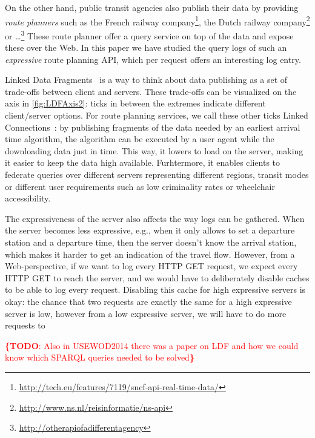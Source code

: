\documentclass{sig-alternate}
\newcommand{\todo}[1]{\noindent\textcolor{red}{{\bf \{TODO}: #1{\bf \}}}}
\begin{document}
On the other hand, public transit agencies also publish their data by providing \emph{route planners} such as the French railway company\footnote{\url{http://tech.eu/features/7119/sncf-api-real-time-data/}}, the Dutch railway company\footnote{\url{http://www.ns.nl/reisinformatie/ns-api}} or \ldots\footnote{\url{http://otherapiofadifferentagency}}
These route planner offer a query service on top of the data and expose these over the Web.
In this paper we have studied the query logs of such an \emph{expressive} route planning API, which per request offers an interesting log entry.

Linked Data Fragments~\cite{ldf} is a way to think about data publishing as a set of trade-offs between client and servers.
These trade-offs can be visualized on the axis in \cref{fig:LDFAxis2}: ticks in between the extremes indicate different client/server options.
For route planning services, we call these other ticks Linked Connections~\cite{lc}: 
by publishing fragments of the data needed by an earliest arrival time algorithm, the algorithm can be executed by a user agent while the downloading data just in time.
This way, it lowers to load on the server, making it easier to keep the data high available.
Furhtermore, it enables clients to federate queries over different servers representing different regions, transit modes or different user requirements such as low criminality rates or wheelchair accessibility.



The expressiveness of the server also affects the way logs can be gathered.
When the server becomes less expressive, e.g., when it only allows to set a departure station and a departure time, then the server doesn't know the arrival station, which makes it harder to get an indication of the travel flow.
However, from a Web-perspective, if we want to log every HTTP GET request, we expect every HTTP GET to reach the server, and we would have to deliberately disable caches to be able to log every request.
Disabling this cache for high expressive servers is okay: the chance that two requests are exactly the same for a high expressive server is low, however from a low expressive server, we will have to do more requests to 

\todo{Also in USEWOD2014 there was a paper on LDF and how we could know which SPARQL queries needed to be solved}

\end{document}
